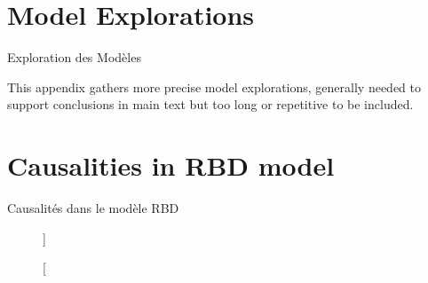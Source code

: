 


\section{Model Explorations}{Exploration des Modèles} %


This appendix gathers more precise model explorations, generally needed to support conclusions in main text but too long or repetitive to be included.









\section{Causalities in RBD model}{Causalités dans le modèle RBD}



\begin{figure}
\caption[][]{}{}
\end{figure}




